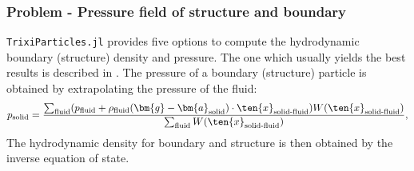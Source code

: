\begin{frame}
    \frametitle{Problem - Pressure field of structure and boundary}
    \texttt{TrixiParticles.jl} provides five options to compute the hydrodynamic boundary (structure) density and
    pressure. The one which usually yields the best results is described in
    \cite{Adami_2012}. The pressure of a boundary (structure) particle is obtained by
    extrapolating the pressure of the fluid:
    \begin{align}
        p_{\text{solid}} = \frac{\sum_\text{fluid} (p_\text{fluid} + \rho_\text{fluid} (\bm{g} - \bm{a}_{\text{solid}}) \cdot \ten{x}_{\text{solid-fluid}}) W(
            \ten{x}_{\text{solid-fluid}} )}{\sum_\text{fluid} W( \ten{x}_{\text{solid-fluid}})},
    \end{align}
    The hydrodynamic density for boundary and structure is then obtained by the inverse equation of state.

\end{frame}
